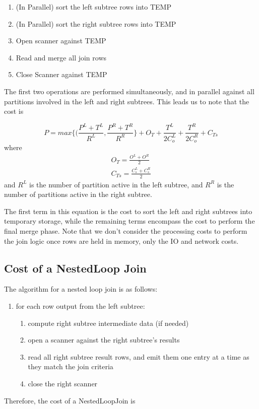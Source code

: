 \documentclass[10pt]{amsart}
\begin{document}
\begin{enumerate}
				\item (In Parallel) sort the left subtree rows into TEMP
				\item (In Parallel) sort the right subtree rows into TEMP
				\item Open scanner against TEMP
				\item Read and merge all join rows
				\item Close Scanner against TEMP
\end{enumerate}

The first two operations are performed simultaneously, and in parallel against all partitions involved in the left and right subtrees. This leads us to note that the cost is

\begin{equation}
				P = max\lbrace(\frac{P^L+T^L}{R^L},\frac{P^R+T^R}{R^R}\rbrace + O_T+\frac{T^L}{2C_o^L}+\frac{T^R}{2C_o^R}+C_{Ts}
\end{equation}
where
\begin{equation*}
				\begin{aligned}
				O_T = \frac{O^L+O^R}{2} \\
				C_{Ts} = \frac{C_s^L+C_s^R}{2}
				\end{aligned}
\end{equation*}
and $R^L$ is the number of partition active in the left subtree, and $R^R$ is the number of partitions active in the right subtree.

The first term in this equation is the cost to sort the left and right subtrees into temporary storage, while the remaining terms encompass the cost to perform the final merge phase. Note that we don't consider the processing costs to perform the join logic once rows are held in memory, only the IO and network costs.

\subsection{Cost of a NestedLoop Join}
The algorithm for a nested loop join is as follows:

\begin{enumerate}
				\item for each row output from the left subtree:
								\begin{enumerate}
												\item compute right subtree intermediate data (if needed)
												\item open a scanner against the right subtree's results
												\item read all right subtree result rows, and emit them one entry at a time as they match the join criteria
												\item close the right scanner
								\end{enumerate}
\end{enumerate}
Therefore, the cost of a NestedLoopJoin is
\end{document}

